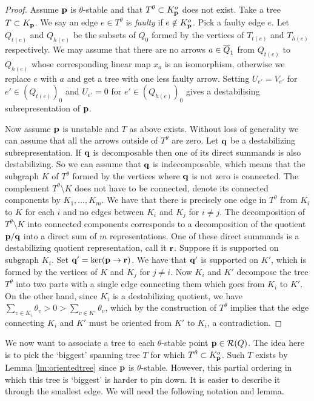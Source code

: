 \documentclass{amsart}
\theoremstyle{definition}
\begin{document}
\begin{proof}
Assume $\mathbf{p}$ is $\theta$-stable and that $T^\theta \subset K_{\mathbf{p}}^o$ does not exist.
Take a tree $T \subset K_{\mathbf{p}}$. We say an edge $e \in T^\theta$ is \emph{faulty} if $e\notin K_{\mathbf{p}}^o$. Pick a faulty edge $e$.
Let $Q_{t(e)}$ and $Q_{h(e)}$ be the subsets of $Q_0$ formed by the vertices of $T_{t(e)}$ and $T_{h(e)}$ respectively. We may assume that there are no arrows $a \in {\overline{Q}}_1$ from $Q_{t(e)}$ to $Q_{h(e)}$ whose corresponding linear map $x_{a}$ is an isomorphism, otherwise we replace $e$ with $a$ and get a tree with one less faulty arrow.
Setting $U_{e'} = V_{e'}$ for $e' \in (Q_{t(e)})_0$ and $U_{e'}=0$ for $e' \in (Q_{h(e)})_0$ gives a destabilising subrepresentation of $\mathbf{p}$.

Now assume $\mathbf{p}$ is unstable and $T$ as above exists. Without loss of generality we can assume that all the arrows outside of $T^\theta$ are zero. Let $\mathbf{q}$ be a destabilizing subrepresentation. If $\mathbf{q}$ is decomposable then one of its direct summands is also destabilizing. So we can assume that $\mathbf{q}$ is indecomposable, which means that the subgraph $K$ of $T^\theta$ formed by the vertices where $\mathbf{q}$ is not zero is connected. The complement $T^\theta\setminus K$ does not have to be connected, denote its connected components by $K_1,\ldots,K_m$. We have that there is precisely one edge in $T^\theta$ from $K_i$ to $K$ for each $i$ and no edges between $K_i$ and $K_j$ for $i\neq j$. The decomposition of $T^\theta\setminus K$ into connected components corresponds to a decomposition of the quotient $\mathbf{p}/\mathbf{q}$ into a direct sum of $m$ representations. One of these direct summands is a destabilizing quotient representation, call it $\mathbf{r}$. Suppose it is supported on subgraph $K_i$. Set $\mathbf{q}'=\ker(\mathbf{p}\to\mathbf{r})$. We have that $\mathbf{q}'$ is supported on $K'$, which is formed by the vertices of $K$ and $K_j$ for $j\neq i$. Now $K_i$ and $K'$ decompose the tree $T^\theta$ into two parts with a single edge connecting them which goes from $K_i$ to $K'$. On the other hand, since $K_i$ is a destabilizing quotient, we have $\sum_{v\in K_i} \theta_v>0>\sum_{v\in K'} \theta_v$, which by the construction of $T^\theta$ implies that the edge connecting $K_i$ and $K'$ must be oriented from $K'$ to $K_i$, a contradiction.
\end{proof}

We now want to associate a tree to each $\theta$-stable point $\mathbf{p} \in \mathcal{R}(Q)$.
The idea here is to pick the `biggest' spanning tree $T$ for which $T^\theta \subset K_{\mathbf{p}}^o$.
Such $T$ exists by Lemma \ref{lm:orientedtree} since $\mathbf{p}$ is $\theta$-stable.
However, this partial ordering in which this tree is `biggest' is harder to pin down.
It is easier to describe it through the smallest edge.
We will need the following notation and lemma.
\end{document}
